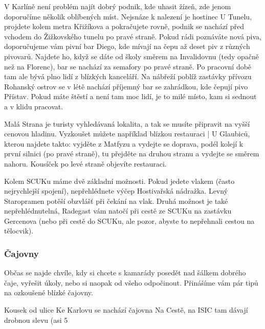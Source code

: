 V Karlíně není problém najít dobrý podnik, kde uhasit žízeň, zde jenom doporučíme několik oblíbených míst. Nejsnáze k nalezení je hostinec U Tunelu, projdete kolem metra Křižíkova a pokračujete rovně, podnik se nachází před vchodem do Žižkovského tunelu po pravé straně. Pokud rádi poznáváte nová piva, doporučujeme vám pivní bar Diego, kde mívají na čepu až deset piv z různých pivovarů. Najdete ho, když se dáte od školy směrem na Invalidovnu (tedy opačně než na Florenc), bar se nachází za semafory po pravé straně. Po pracovní době tam ale bývá plno lidí z blízkých kanceláří. Na nábřeží poblíž zastávky přívozu Rohanský ostrov se v létě nachází příjemný bar se zahrádkou, kde čepují pivo Přístav. Pokud máte štěstí a není tam moc lidí, je to milé místo, kam si sednout a v klidu pracovat.

Malá Strana je turisty vyhledávaná lokalita, a tak se musíte připravit na vyšší cenovou hladinu. Vyzkoušet můžete například blízkou restauraci | U Glaubiců, kterou najdete takto: vyjděte z Matfyzu a vydejte se doprava, podél kolejí k první silnici (po pravé straně), tu přejděte na druhou stranu a vydejte se směrem nahoru. Kousíček po levé straně objevíte restauraci.

Kolem SCUKu máme dvě základní možnosti. Pokud jedete vlakem (často nejrychlejší spojení), nepřehlédnete výčep Hostivařská nádražka. Levný Staropramen potěší obzvlášť při čekání na vlak. Druhá možnost je také nepřehlédnutelná, Radegast vám natočí při cestě ze SCUKu na zastávku Gercenova (nebo při cestě do SCUKu, ale pozor, abyste to nepřehnali cestou na tělocvik).


\subsubsection{Čajovny}
Občas se najde chvíle, kdy si chcete s kamarády posedět nad šálkem dobrého čaje, vyřešit úkoly, nebo si naopak od všeho odpočinout. Přinášíme vám pár tipů na ozkoušené blízké čajovny.

Kousek od ulice Ke Karlovu se nachází čajovna Na Cestě, na ISIC tam dávají drobnou slevu (asi 5 %

